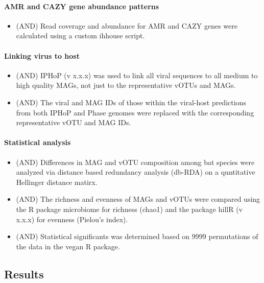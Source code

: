 \documentclass[
]{article}
\providecommand{\tightlist}{%
  \setlength{\itemsep}{0pt}\setlength{\parskip}{0pt}}
\begin{document}
\paragraph{AMR and CAZY gene abundance
patterns}\label{amr-and-cazy-gene-abundance-patterns}

\begin{itemize}
\tightlist
\item
  (AND) Read coverage and abundance for AMR and CAZY genes were
  calculated using a custom ihhouse script.
\end{itemize}

\paragraph{Linking virus to host}\label{linking-virus-to-host}

\begin{itemize}
\tightlist
\item
  (AND) IPHoP (v x.x.x) was used to link all viral sequences to all
  medium to high quality MAGs, not just to the representative vOTUs and
  MAGs.
\item
  (AND) The viral and MAG IDs of those within the viral-host predictions
  from both IPHoP and Phase genomes were replaced with the corresponding
  representative vOTU and MAG IDs.
\end{itemize}

\paragraph{Statistical analysis}\label{statistical-analysis}

\begin{itemize}
\tightlist
\item
  (AND) Differences in MAG and vOTU composition among bat species were
  analyzed via distance based redundancy analysis (db-RDA) on a
  quntitative Hellinger distance matirx.
\item
  (AND) The richness and evenness of MAGs and vOTUs were compared using
  the R package microbiome for richness (chao1) and the package hillR (v
  x.x.x) for evenness (Pielou's index).
\item
  (AND) Statistical significants was determined based on 9999
  permutations of the data in the vegan R package.
\end{itemize}

\subsection{Results}\label{results}
\end{document}
